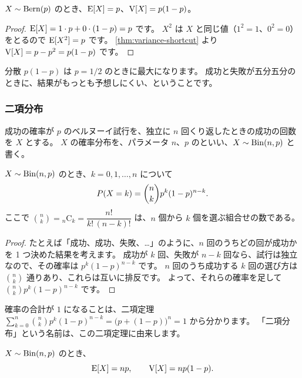 \begin{proposition}
  $X \sim \mathrm{Bern}(p)$ のとき、$\mathrm{E}[X] = p$、$\mathrm{V}[X] = p(1 - p)$。
\end{proposition}

\begin{proof}
  $\mathrm{E}[X] = 1 \cdot p + 0 \cdot (1 - p) = p$ です。
  $X^2$ は $X$ と同じ値（$1^2 = 1$、$0^2 = 0$）をとるので $\mathrm{E}[X^2] = p$ です。
  \cref{thm:variance-shortcut} より $\mathrm{V}[X] = p - p^2 = p(1 - p)$ です。
\end{proof}

分散 $p(1 - p)$ は $p = 1/2$ のときに最大になります。
成功と失敗が五分五分のときに、結果がもっとも予想しにくい、ということです。

\subsubsection*{二項分布}

\begin{definition}
  成功の確率が $p$ のベルヌーイ試行を、独立に $n$ 回くり返したときの成功の回数を $X$ とする。
  $X$ の確率分布を、パラメータ $n$、$p$ のといい、$X \sim \mathrm{Bin}(n, p)$ と書く。
\end{definition}

\begin{theorem}
  $X \sim \mathrm{Bin}(n, p)$ のとき、$k = 0, 1, \dots, n$ について
  \[
    P(X = k) = \binom{n}{k} p^k (1 - p)^{n-k}.
  \]
  ここで $\binom{n}{k} = {}_n\mathrm{C}_k = \dfrac{n!}{k!\,(n-k)!}$ は、$n$ 個から $k$ 個を選ぶ組合せの数である。
\end{theorem}

\begin{proof}
  たとえば「成功、成功、失敗、\dots」のように、$n$ 回のうちどの回が成功かを 1 つ決めた結果を考えます。
  成功が $k$ 回、失敗が $n - k$ 回なら、試行は独立なので、その確率は $p^k (1 - p)^{n-k}$ です。
  $n$ 回のうち成功する $k$ 回の選び方は $\binom{n}{k}$ 通りあり、これらは互いに排反です。
  よって、それらの確率を足して $\binom{n}{k} p^k (1 - p)^{n-k}$ です。
\end{proof}

確率の合計が $1$ になることは、二項定理 $\sum_{k=0}^{n} \binom{n}{k} p^k (1-p)^{n-k} = \bigl(p + (1 - p)\bigr)^n = 1$ から分かります。
「二項分布」という名前は、この二項定理に由来します。

\begin{theorem}
  $X \sim \mathrm{Bin}(n, p)$ のとき、
  \[
    \mathrm{E}[X] = np, \qquad \mathrm{V}[X] = np(1 - p).
  \]
\end{theorem}

